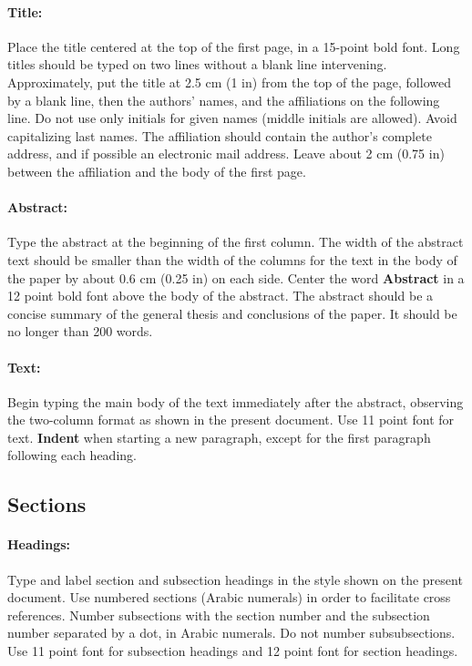\documentclass[11pt]{article}
\begin{document}
\paragraph{Title:} Place the title centered at the top of the first page, in
a 15-point bold font. Long titles should be typed on two lines without
a blank line intervening. Approximately, put the title at 2.5 cm (1 in) from
the top of the page, followed by a blank line, then the authors'
names, and the affiliations on the following line. Do not use only
initials for given names (middle initials are allowed). Avoid
capitalizing last names. The affiliation should contain the author's
complete address, and if possible an electronic mail address. Leave
about 2 cm (0.75 in) between the affiliation and the body of the first page.

\paragraph{Abstract:} Type the abstract at the beginning of the first
column. The width of the abstract text should be smaller than the
width of the columns for the text in the body of the paper by about
0.6 cm (0.25 in) on each side. Center the word {\bf Abstract} in a 12 point bold
font above the body of the abstract. The abstract should be a concise
summary of the general thesis and conclusions of the paper. It should
be no longer than 200 words.

\paragraph{Text:} Begin typing the main body of the text immediately after the
abstract, observing the two-column format as shown in the present document.
Use 11 point font for text. {\bf Indent} when starting a new paragraph, except
for the first paragraph following each heading.


\subsection{Sections}

\paragraph{Headings:} Type and label section and subsection headings in the
style shown on the present document.  Use numbered sections (Arabic
numerals) in order to facilitate cross references. Number subsections
with the section number and the subsection number separated by a dot,
in Arabic numerals. Do not number subsubsections. Use 11 point font for
subsection headings and 12 point font for section headings.
\end{document}
